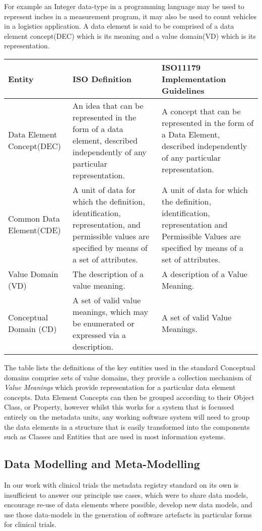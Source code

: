 For example an Integer data-type in a programming language may be used to represent inches in a measurement program, it may also be used to count vehicles in a logistics application.  A data element is said to be comprised of a data element concept(DEC) which is its meaning and a value domain(VD) which is its representation.

\begin{table}[h]
	\begin{tabular}{ p{1.8cm} p{2.8cm}  p{3.0cm}  }  %
		\hline
		Entity & ISO Definition & ISO11179 Implementation Guidelines  \\ 
		\hline
		Data Element Concept(DEC) & An idea that can be represented in the form of a data element, described independently of any particular representation. & A concept that can be represented in the form of a Data Element, described independently of any particular representation.\\
		Common Data Element(CDE) & A unit of data for which the definition, identification, representation, and permissible values are specified by means of a set of attributes. & A unit of data for which the definition, identification, representation and Permissible Values are specified by means of a set of attributes. \\
		Value Domain (VD) & The description of a value meaning. & A description of a Value Meaning. \\
		Conceptual Domain (CD) & A set of valid value meanings, which may be enumerated or expressed via a description.& A set of valid Value Meanings.\\
		\hline
	\end{tabular}
\end{table}

The table lists the definitions of the key entities used in the standard
Conceptual domains comprise sets of value domains, they provide a collection mechanism of \emph{Value Meanings} which provide representation for a particular data element concepts. Data Element Concepts can then be grouped according to their Object Class, or Property, however whilst this works for a system that is focussed entirely on the metadata units, any working software system will need to group the data elements in a structure that is easily transformed into the components such as Classes and Entities that are used in most information systems.   



\subsection{Data Modelling and Meta-Modelling}
In our work with clinical trials the metadata registry standard on its own is insufficient to answer our principle use cases, which were to share data models, encourage re-use of data elements where possible, develop new data models, and use those data-models in the generation of software artefacts in particular forms for clinical trials.

